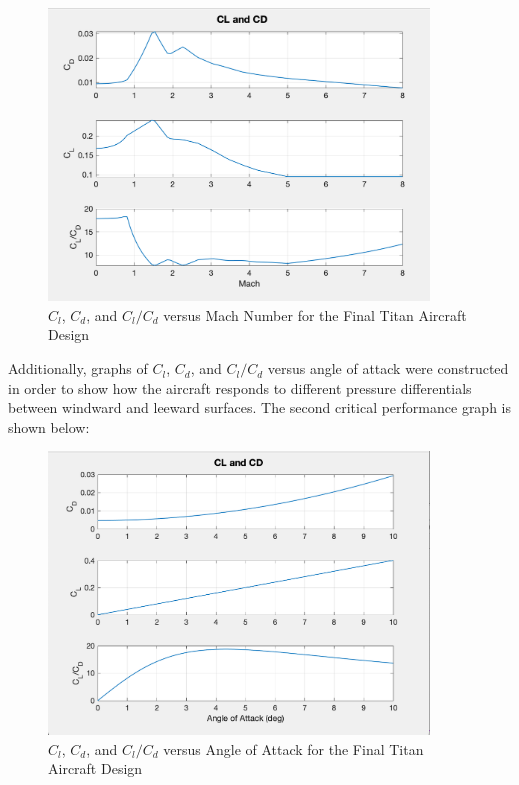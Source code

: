 \documentclass{article}
\begin{document}
\begin{figure}[H]
    \centering
    \includegraphics[width = 0.90\textwidth]{Figures/FlightEnvelope.png}
    \caption{${C_{l}}$, ${C_{d}}$, and ${C_{l}}/{C_{d}}$ versus Mach Number for the Final Titan Aircraft Design}
    \label{fig:FlightEnvelope}
\end{figure}

Additionally, graphs of ${C_{l}}$, ${C_{d}}$, and ${C_{l}}/{C_{d}}$ versus angle of attack were constructed in order to show how the aircraft responds to different pressure differentials between windward and leeward surfaces. The second critical performance graph is shown below: 

\begin{figure}[H]
    \centering
    \includegraphics[width = 0.90\textwidth]{Figures/ClCdvAOA11.png}
    \caption{${C_{l}}$, ${C_{d}}$, and ${C_{l}}/{C_{d}}$ versus Angle of Attack for the Final Titan Aircraft Design}
    \label{fig:ClCdvAOA11}
\end{figure}
\end{document}
